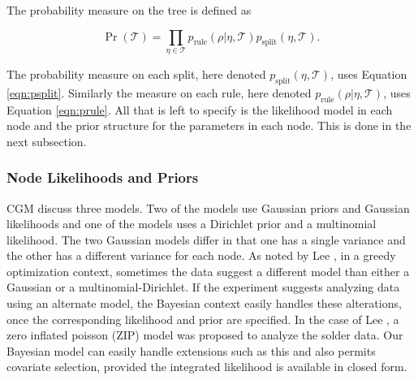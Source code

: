 \documentclass{article}
\begin{document}
 The probability measure on the tree is defined as 
 
 \begin{equation}
 \Pr(\mathcal{T}) = \prod_{\eta \in \mathcal{T}} p_{\text{rule}}(\rho \vert \eta, \mathcal{T})p_{\text{split}}(\eta, \mathcal{T}).
\end{equation}

The probability measure on each split, here denoted $p_{\text{split}}(\eta, \mathcal{T})$, uses Equation \ref{eqn:psplit}. Similarly the measure on each rule, here denoted $p_{\text{rule}}(\rho \vert \eta, \mathcal{T})$, uses Equation \ref{eqn:prule}. 
All that is left to specify is the likelihood model in each node and the prior structure for the parameters in each node. This is done in the next subsection. 

\subsubsection{Node Likelihoods and Priors}

CGM discuss three models. Two of the models use Gaussian priors and Gaussian likelihoods and one of the models uses a Dirichlet prior and a multinomial likelihood. The two Gaussian models differ in that one has a single variance and the other has a different variance for each node. As noted by Lee \cite{lee2006decision}, in a greedy optimization context, sometimes the data suggest a different model than either a Gaussian or a multinomial-Dirichlet. If the experiment suggests analyzing data using an alternate model, the Bayesian context easily handles these alterations, once the corresponding likelihood and prior are specified. In the case of Lee \cite{lee2006decision}, a zero inflated poisson (ZIP) model was proposed to analyze the solder data. Our Bayesian model can easily handle extensions such as this and also permits covariate selection, provided the integrated likelihood is available in closed form.
\end{document}
